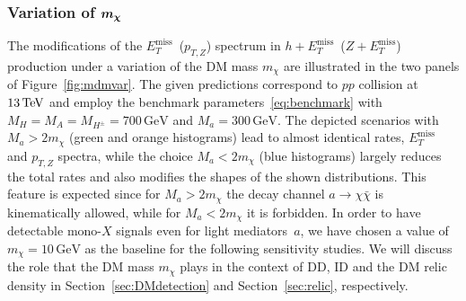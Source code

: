 \documentclass[review]{elsarticle}
\newcommand{\MET}{\ensuremath{E_T^\mathrm{miss}}\xspace}
\newcommand{\mA}{\ensuremath{M_{A}}\xspace}
\newcommand{\ma}{\ensuremath{M_{a}}\xspace}
\newcommand{\mH}{\ensuremath{M_{H}}\xspace}
\newcommand{\mHc}{\ensuremath{M_{H^{\pm}}}\xspace}
\def\bm#1{\mbox{\boldmath$#1$\unboldmath}}
\begin{document}
\subsubsection[Variation of $m_\chi$]{Variation of $\bm{m_\chi}$}

The modifications of the $\MET$~($p_{T,Z}$) spectrum in $h+\MET$~($Z+\MET$) production under a variation of the DM mass $m_\chi$ are illustrated in the two panels of Figure~\ref{fig:mdmvar}. The given predictions correspond to $pp$ collision at $13 \, {\rm TeV}$ and employ the benchmark parameters~\eqref{eq:benchmark} with $\mH = \mA = \mHc = 700 \, {\mathrm{GeV}}$ and $\ma = 300 \, {\mathrm{GeV}}$. The depicted scenarios with $\ma  > 2 m_\chi$ (green and orange histograms) lead to almost identical rates, $\MET$ and $p_{T,Z}$ spectra, while the choice $\ma  < 2 m_\chi$ (blue histograms) largely reduces the total rates and also modifies the shapes of the shown distributions. This feature is expected since for $\ma > 2 m_\chi$ the decay channel $a \to \chi \bar \chi$ is kinematically allowed, while for $\ma < 2 m_\chi$ it is forbidden. In order to have detectable mono-$X$ signals even for light mediators~$a$, we have chosen a value of  $m_\chi = 10 \, {\mathrm{GeV}}$ as the baseline for the following sensitivity studies.  We will discuss the role that the DM mass $m_\chi$ plays in the context of DD, ID and the DM relic density in Section~\ref{sec:DMdetection}  and Section~\ref{sec:relic}, respectively. 
\end{document}
